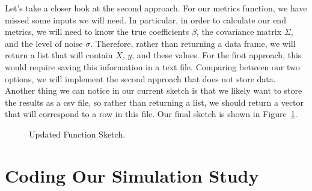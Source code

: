 \documentclass[
  letterpaper,
]{latex/krantz}
\begin{document}
Let's take a closer look at the second approach. For our metrics
function, we have missed some inputs we will need. In particular, in
order to calculate our end metrics, we will need to know the true
coefficients \(\beta\), the covariance matrix \(\Sigma\), and the level
of noise \(\sigma\). Therefore, rather than returning a data frame, we
will return a list that will contain \(X\), \(y\), and these values. For
the first approach, this would require saving this information in a text
file. Comparing between our two options, we will implement the second
approach that does not store data. Another thing we can notice in our
current sketch is that we likely want to store the results as a csv
file, so rather than returning a list, we should return a vector that
will correspond to a row in this file. Our final sketch is shown in
Figure~\ref{fig-final-approach}.

\begin{figure}


\caption{\label{fig-final-approach}Updated Function Sketch.}

\end{figure}%

\section{Coding Our Simulation Study}\label{coding-our-simulation-study}
\end{document}
